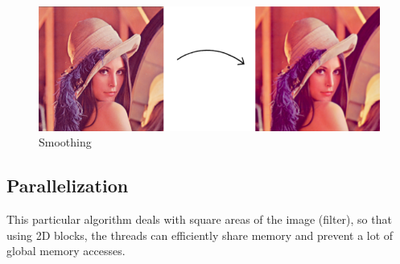\documentclass[a4paper]{article}
\begin{document}
\begin{figure}[ht]
    \centering
    \includegraphics[width=0.5\linewidth]{smooth}
    \caption{Smoothing}
    \label{fig:smooth}
\end{figure}
\FloatBarrier


\subsection{Parallelization}
\label{sec:p2}
This particular algorithm deals with square areas of the image (filter), so that using 2D blocks, the threads can efficiently share memory and prevent a lot of global memory accesses.
\end{document}
